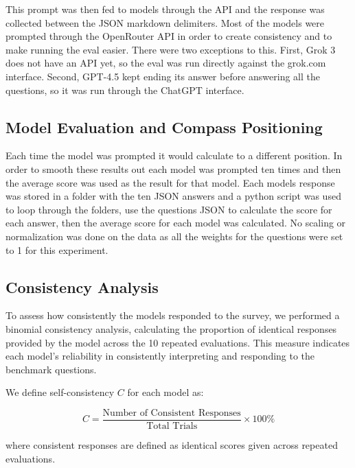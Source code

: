 This prompt was then fed to models through the API and the response was collected between the JSON markdown delimiters. Most of the models were prompted through the OpenRouter API in order to create consistency and to make running the eval easier. There were two exceptions to this. First, Grok 3 does not have an API yet, so the eval was run directly against the grok.com interface. Second, GPT-4.5 kept ending its answer before answering all the questions, so it was run through the ChatGPT interface.

\subsection{Model Evaluation and Compass Positioning}
Each time the model was prompted it would calculate to a different position. In order to smooth these results out each model was prompted ten times and then the average score was used as the result for that model. Each models response was stored in a folder with the ten JSON answers and a python script was used to loop through the folders, use the questions JSON to calculate the score for each answer, then the average score for each model was calculated. No scaling or normalization was done on the data as all the weights for the questions were set to 1 for this experiment.

\subsection{Consistency Analysis}
To assess how consistently the models responded to the survey, we performed a binomial consistency analysis, calculating the proportion of identical responses provided by the model across the 10 repeated evaluations. This measure indicates each model's reliability in consistently interpreting and responding to the benchmark questions.

We define self-consistency \(C\) for each model as:

\[
C = \frac{\text{Number of Consistent Responses}}{\text{Total Trials}} \times 100\%
\]

where consistent responses are defined as identical scores given across repeated evaluations.
